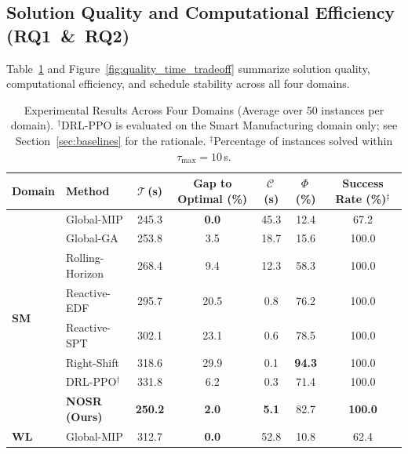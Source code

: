 \documentclass[manuscript,screen,review]{acmart}
\begin{document}
\subsection{Solution Quality and Computational Efficiency (RQ1~\&~RQ2)}
\label{sec:main_results}

Table~\ref{tab:main_results} and Figure~\ref{fig:quality_time_tradeoff}
summarize solution quality, computational efficiency, and schedule stability
across all four domains.

\begin{table}[t]
\centering
\caption{Experimental Results Across Four Domains
(Average over 50 instances per domain).
$^\dagger$DRL-PPO is evaluated on the Smart Manufacturing domain only;
see Section~\ref{sec:baselines} for the rationale.
$^\ddagger$Percentage of instances solved within $\tau_{\max}=10$\,s.}
\label{tab:main_results}
\small
\setlength{\tabcolsep}{6pt}
\begin{tabular}{@{}llccccc@{}}
\toprule
\textbf{Domain} & \textbf{Method}
& $\mathcal{T}$\,\textbf{(s)}
& \textbf{Gap to Optimal (\%)}
& $\mathcal{C}$\,\textbf{(s)}
& $\Phi$\,\textbf{(\%)}
& \textbf{Success Rate (\%)}$^\ddagger$ \\
\midrule
\multirow{8}{*}{\textbf{SM}}
& Global-MIP      & 245.3          & \textbf{0.0} & 45.3 & 12.4          & 67.2          \\
& Global-GA       & 253.8          & 3.5          & 18.7 & 15.6          & 100.0         \\
& Rolling-Horizon & 268.4          & 9.4          & 12.3 & 58.3          & 100.0         \\
& Reactive-EDF    & 295.7          & 20.5         & 0.8  & 76.2          & 100.0         \\
& Reactive-SPT    & 302.1          & 23.1         & 0.6  & 78.5          & 100.0         \\
& Right-Shift     & 318.6          & 29.9         & 0.1  & \textbf{94.3} & 100.0         \\
& DRL-PPO$^\dagger$ & 331.8        & 6.2          & 0.3  & 71.4          & 100.0         \\
\cmidrule{2-7}
& \textbf{NOSR (Ours)} & \textbf{250.2} & \textbf{2.0} & \textbf{5.1} & 82.7 & \textbf{100.0} \\
\midrule
\multirow{7}{*}{\textbf{WL}}
& Global-MIP      & 312.7          & \textbf{0.0} & 52.8 & 10.8          & 62.4          \\

\end{tabular}
\end{table}
\end{document}
